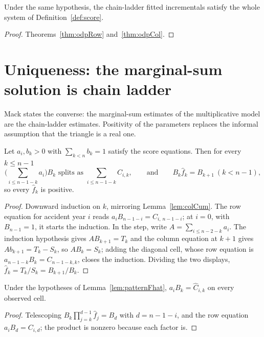\begin{theorem}\label{thm:odpScore}\leanok
{}
Under the same hypothesis, the chain-ladder fitted incrementals satisfy the whole
system of Definition~\ref{def:score}.
\end{theorem}
\begin{proof}\leanok Theorems~\ref{thm:odpRow} and~\ref{thm:odpCol}. \end{proof}

\section{Uniqueness: the marginal-sum solution is chain ladder}

Mack \cite[Section 2]{Mack1991} states the converse: the marginal-sum estimates of the
multiplicative model are the chain-ladder estimates. Positivity of the parameters
replaces the informal assumption that the triangle is a real one.

\begin{lemma}\label{lem:patternFhat}\leanok
{}
Let $a_i, b_k > 0$ with $\sum_{k<n} b_k = 1$ satisfy the score equations. Then for every
$k \le n-1$
\[
  \Big(\sum_{i \le n-1-k} a_i\Big) B_k \text{ splits as } \sum_{i \le n-1-k} C_{i,k},
  \qquad\text{and}\qquad B_k \hat f_k = B_{k+1} \ (k < n-1),
\]
so every $\hat f_k$ is positive.
\end{lemma}
\begin{proof}\leanok
Downward induction on $k$, mirroring Lemma~\ref{lem:colCum}. The row equation for
accident year $i$ reads $a_i B_{n-1-i} = C_{i,\,n-1-i}$; at $i = 0$, with $B_{n-1} = 1$,
it starts the induction. In the step, write $A = \sum_{i \le n-2-k} a_i$. The induction
hypothesis gives $A B_{k+1} = T_k$ and the column equation at $k+1$ gives
$A b_{k+1} = T_k - S_k$, so $A B_k = S_k$; adding the diagonal cell, whose row equation
is $a_{n-1-k} B_k = C_{n-1-k,k}$, closes the induction. Dividing the two displays,
$\hat f_k = T_k/S_k = B_{k+1}/B_k$.
\end{proof}

\begin{lemma}\label{lem:multCum}\leanok
{}
Under the hypotheses of Lemma~\ref{lem:patternFhat}, $a_i B_k = \hat C_{i,k}$ on every
observed cell.
\end{lemma}
\begin{proof}\leanok
Telescoping $B_k \prod_{j=k}^{d-1}\hat f_j = B_d$ with $d = n-1-i$, and the row equation
$a_i B_d = C_{i,d}$; the product is nonzero because each factor is.
\end{proof}

